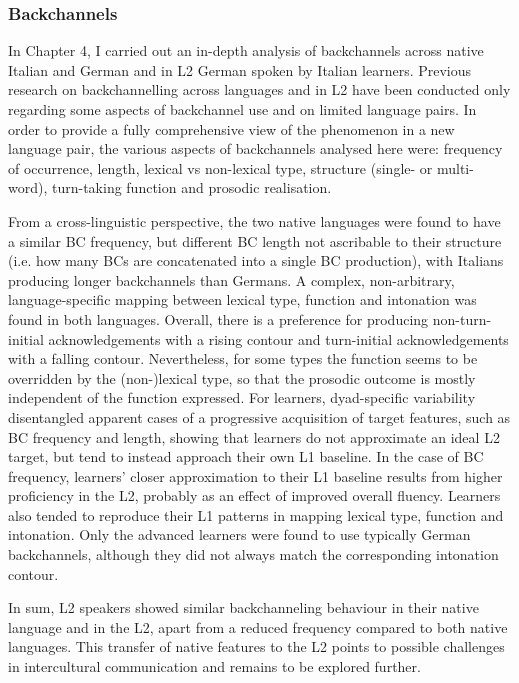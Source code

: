 \subsubsection{Backchannels}
\hypertarget{Toc191305964}{}\begin{stylecaption}
\textup{In Chapter 4, I carried out an in-depth analysis of backchannels across native Italian and German and in L2 German spoken by Italian learners. Previous research on backchannelling across languages and in L2 have been conducted only regarding some aspects of backchannel use and on limited language pairs. In order to provide a fully comprehensive view of the phenomenon in a new language pair, the various aspects of backchannels analysed here were: frequency of occurrence, length, lexical vs non-lexical type, structure (single- or multi-word), turn-taking function and prosodic realisation.}
\end{stylecaption}

\begin{stylecaption}
\textup{From a cross-linguistic perspective, the two native languages were found to have a similar BC frequency, but different BC length not ascribable to their structure (i.e. how many BCs are concatenated into a single BC production), with Italians producing longer backchannels than Germans. A complex, non-arbitrary, language-specific mapping between lexical type, function and intonation was found in both languages. Overall, there is a preference for producing non-turn-initial acknowledgements with a rising contour and turn-initial acknowledgements with a falling contour. Nevertheless, for some types the function seems to be overridden by the (non-)lexical type, so that the prosodic outcome is mostly independent of the function expressed. For learners, dyad-specific variability disentangled apparent cases of a progressive acquisition of target features, such as BC frequency and length, showing that learners do not approximate an ideal L2 target, but tend to instead approach their own L1 baseline. In the case of BC frequency, learners’ closer approximation to their L1 baseline results from higher proficiency in the L2, probably as an effect of improved overall fluency. Learners also tended to reproduce their L1 patterns in mapping lexical type, function and intonation. Only the advanced learners were found to use typically German backchannels, although they did not always match the corresponding intonation contour.} 
\end{stylecaption}

\begin{stylecaption}
\textup{In sum, L2 speakers showed similar backchanneling behaviour in their native language and in the L2, apart from a reduced frequency compared to both native languages. This transfer of native features to the L2 points to possible challenges in intercultural communication and remains to be explored further.}
\end{stylecaption}

